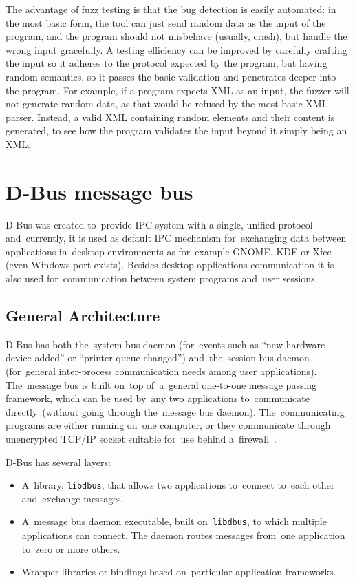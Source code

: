 \documentclass[conference]{IEEEtran}
\begin{document}
The advantage of fuzz testing is that the bug detection is easily automated: in
the most basic form, the tool can just send random data as the input of the
program, and the program should not misbehave (usually, crash), but handle the
wrong input gracefully. A testing efficiency can be improved by carefully
crafting the input so it adheres to the protocol expected by the program, but
having random semantics, so it passes the basic validation and penetrates deeper
into the program. For example, if a program expects XML as an input, the fuzzer
will not generate random data, as that would be refused by the most basic XML
parser. Instead, a valid XML containing random elements and their content is
generated, to see how the program validates the input beyond it simply being an
XML.

\section{D-Bus message bus}
D-Bus was created to~provide IPC system with a single, unified protocol
and~currently, it is used as default IPC mechanism for~exchanging data between
applications in~desktop environments as for~example GNOME, KDE or Xfce (even
Windows port exists). Besides desktop applications communication it is also used
for~communication between system programs and~user sessions.

\subsection{General Architecture}

D-Bus has both the~system bus daemon (for~events such as ``new hardware device
added'' or ``printer queue changed'') and~the~session bus daemon (for~general
inter-process communication needs among user \mbox{applications}). The~message
bus is built on~top of~a~general one-to-one message passing framework, which
can be used by~any two applications to~communicate directly~(without going
through the~message bus daemon). The~communicating programs are either running
on~one computer, or they communicate through unencrypted TCP/IP socket suitable
for~use behind a~firewall~\cite{dbus}.


D-Bus has several layers:
\begin{itemize}
	\item A~library, \texttt{libdbus}, that allows two applications to~connect
		to~each other and~exchange messages.
	\item A~message bus daemon executable, built on~\texttt{libdbus},
		to which multiple applications can connect. The daemon routes
		messages from~one application to~zero or more others.
	\item Wrapper libraries or bindings based on~particular application frameworks.
\end{itemize}
\end{document}
